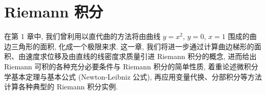 \chapter{Riemann 积分}\label{ch:6}

在第 1 章中, 我们曾利用以直代曲的方法将由曲线 $y=x^{2}$, $y=0$, $x=1$ 围成的曲边三角形的面积, 化成一个极限来求. 这一章, 我们将进一步通过计算曲边梯形的面积、由速度求位移及由直线的线密度求质量引进 Riemann 积分的概念, 进而给出 Riemann 可积的各种充分必要条件与 Riemann 积分的简单性质, 着重论述微积分学基本定理与基本公式 (Newton-Leibniz 公式), 再应用变量代换、分部积分等方法计算各种典型的 Riemann 积分实例.








